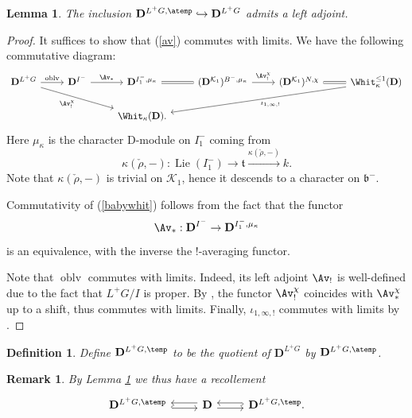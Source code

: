 \documentclass[9pt]{amsart}
\newcommand{\cK}{{\mathcal K}}
\DeclareMathOperator{\oblv}{{oblv}}
\DeclareMathOperator{\Lie}{{Lie}}
\newtheorem{lm}[subsubsection]{Lemma}
\newtheorem{df}[subsubsection]{Definition}
\newtheorem{rem}[subsubsection]{Remark}
\numberwithin{equation}{section}
\begin{document}
\begin{lm}\label{leftadj}
	The inclusion  $\mathbf{D}^{L^+G, \atemp} \hookrightarrow \mathbf{D}^{L^+G}$ admits a left adjoint. 
\end{lm}
\begin{proof}
	It suffices to show that (\ref{av}) commutes with limits. We have the following commutative diagram:
	\begin{equation}\label{babywhit}
	\begin{tikzcd}
	{\mathbf{D}}^{L^+G}\arrow[drr, "\Av_!^{\chi}" ']\ar[r, rightarrow, "\oblv"' ']&   	{\mathbf{D}}^{I^-} \ar[r, rightarrow, "\Av_*"' ']& {\mathbf{D}}^{I_1^-, \mu_{\kappa}} \arrow[r, equal]& ({\mathbf{D}}^{\cK_1} )^{B^-, \mu_{\kappa}} \ar[r, rightarrow, "\Av_!^{\chi}"' '] &  ({\mathbf{D}}^{\cK_1} )^{N, \chi} \arrow[r, equal]&  \Whit_{\kappa}^{\leq 1}(\mathbf{D}) \arrow[dlll, "\iota_{1, \infty, !}"]\\
	&   & \Whit_{\kappa}(\mathbf{D}).& & & 
	\end{tikzcd}
	\end{equation}
	Here $\mu_{\kappa}$ is the character D-module on $I_1^-$ coming from $$\kappa(\check{\rho}, -): \Lie(I_1^-) \rightarrow \mathfrak{t} \xrightarrow{\kappa(\check{\rho}, -)} k.$$ 
	Note that $\kappa(\check{\rho}, -)$ is trivial on $\cK_1$, hence it descends to a character on $\mathfrak{b}^-$. 
	
	Commutativity of (\ref{babywhit}) follows from the fact that the functor $$\Av_*: {\mathbf{D}}^{I^-} \rightarrow {\mathbf{D}}^{I_1^-, \mu_{\kappa}}$$ is an equivalence, with the inverse the $!$-averaging functor.
	
	Note that $\oblv$ commutes with limits. Indeed, its left adjoint $\Av_!$ is well-defined due to the fact that $L^+G/I$ is proper.   By \cite[3.2.3]{FR}, the functor $\Av_!^{\chi}$ coincides with $\Av_*^{\chi}$ up to a shift, thus commutes with limits. Finally, $\iota_{1, \infty, !}$ commutes with limits by \cite[Theorem 2.3.1 (1)]{R}.
\end{proof}

\begin{df}
	Define $\mathbf{D}^{L^+G, \temp} $ to be the quotient of  $\mathbf{D}^{L^+G}$ by $\mathbf{D}^{L^+G, \atemp} $.
\end{df}

\begin{rem}
	By Lemma \ref{leftadj} we thus have a recollement
	\begin{equation}
	\begin{tikzcd}
	\mathbf{D}^{L^+G, \atemp} \ar[r, hookrightarrow,  shift right, ""]
	& \arrow[l,  shift right, ""]  \mathbf{D} \arrow[r,  shift right, ""]
	& \ar[l, hookrightarrow,  shift right, ""]\mathbf{D}^{L^+G, \temp} .
	\end{tikzcd}
	\end{equation}
	
\end{rem}
\end{document}

